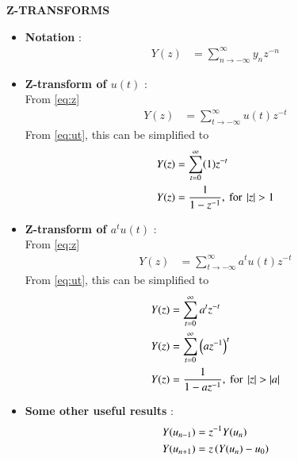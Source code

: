 \documentclass[journal]{IEEEtran}
\begin{document}
\textbf{Z-TRANSFORMS} 
\begin{itemize}
	\item \textbf{Notation} : 
		\begin{align}
			Y(z) &= \sum_{n \to -\infty}^{\infty} y_{n} z^{-n} \label{eq:z}
		\end{align}
	\item \textbf{Z-transform of $u(t)$} : \\
		From \eqref{eq:z}
		\begin{align}
			Y(z) &= \sum_{t \to -\infty}^{\infty} u(t) z^{-t} 
		\end{align}
		From \eqref{eq:ut}, this can be simplified to
		\begin{align}
		        Y(z) &= \sum_{t=0}^{\infty} (1)z^{-t} \\
			Y(z) &= \frac{1}{1 - z^{-1}}, \label{eq:zut} \text{ for } \left\vert z\right\vert > 1 
		\end{align}
	\item \textbf{Z-transform of $a^t u(t)$} : \\
		From \eqref{eq:z} 
		\begin{align}
			Y(z) &= \sum_{t \to -\infty}^{\infty} a^t u(t) z^{-t} 
		\end{align}
		From \eqref{eq:ut}, this can be simplified to
		\begin{align}
			Y(z) &= \sum_{t=0}^{\infty} a^t z^{-t} \\
			Y(z) &= \sum_{t=0}^{\infty} \left(az^{-1}\right)^{t} \\
			Y(z) &= \frac{1}{1 - az^{-1}}, \text{ for } \left\vert z\right\vert > \left\vert a\right\vert \label{eq:atut}
		\end{align}
	\item \textbf{Some other useful results} : \\
		\begin{align}
			Y(u_{n-1}) &= z^{-1} Y(u_{n}) \\
			Y(u_{n+1}) &= z \left(Y(u_{n}) - u_{0}\right)
		\end{align}
\end{itemize}
\end{document}
